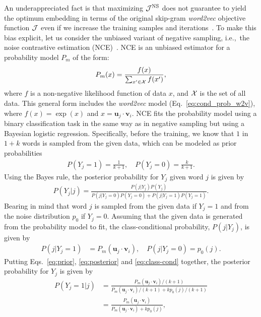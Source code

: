 \documentclass[12pt,draft,a4paper]{article}
\newcommand{\vect}[1]{\boldsymbol{#1}}
\def\ie{i.e.,~}
\begin{document}
An underappreciated fact is that maximizing ${\cal J}^{\text{NS}}$ does not guarantee
to yield the optimum embedding in terms of the original skip-gram {\it word2vec} objective function ${\cal J}$ even if we increase the training samples and iterations~\autocite{Chia2010,Dyer2014}.
To make this bias explicit, let us consider the unbiased variant of negative sampling, \ie the noise contrastive estimation (NCE)~\autocite{Chia2010,Dyer2014}.
NCE is an unbiased estimator for a probability model $P_m$ of the form:
\begin{align}
	\label{eq:nce-model}
	P_m(x) = \frac{ f(x) }{\sum_{ x' \in {\cal X}} f(x') },
\end{align}
where $f$ is a non-negative likelihood function of data $x$, and ${\cal X}$ is the set of all data.
This general form includes the {\it word2vec} model (Eq.~\eqref{eq:cond_prob_w2v}), where $f(x) = \exp(x)$ and $x = \vect{u}_j \cdot \vect{v}_{i}$.
NCE fits the probability model using a binary classification task in the same way as in negative sampling but using a Bayesian logistic regression.
Specifically, before the training, we know that $1$ in $1+k$ words is sampled from the given data, which can be modeled as prior probabilities
\begin{align}
	\label{eq:prior}
	P(Y_{j} = 1) = \frac{1}{k + 1},\quad P(Y_{j} = 0) = \frac{k}{k + 1}.
\end{align}
Using the Bayes rule, the posterior probability for $Y_{j}$ given word $j$ is given by
\begin{align}
	\label{eq:posterior}
	P\left(Y_{j} \vert j\right) = \frac{
		P\left(j \vert Y_{j}\right)P(Y_{j})
	}{
		P\left(j \vert Y_{j} = 0\right)P(Y_{j} = 0)
		+ P\left(j \vert Y_{j} = 1\right)P(Y_{j} = 1)
	}.
\end{align}
Bearing in mind that word $j$ is sampled from the given data if $Y_{j}=1$ and from the noise distribution $p_0$ if $Y_j = 0$.
Assuming that the given data is generated from the probability model to fit, the class-conditional probability, $P\left(j \vert Y_{j}\right)$, is given by
\begin{align}
	\label{eq:class-cond}
	P(j \vert Y_{j} = 1) & = P_m(\vect{u}_j \cdot \vect{v}_{i}),
	\quad
	P(j \vert Y_{j} = 0)  = p_0 (j).
\end{align}
Putting Eqs.~\eqref{eq:prior}, \eqref{eq:posterior} and \eqref{eq:class-cond} together, the posterior probability for $Y_j$ is given by
\begin{align}
	\label{eq:nce}
	P\left(Y_{j} = 1 \vert j\right) & =
	\frac{
		P_m(\vect{u}_j \cdot \vect{v}_{i}) / (k + 1)
	}{
		P_m(\vect{u}_j \cdot \vect{v}_{i}) / (k + 1)  + kp_0(j) / (k + 1)
	}                                          \\
	                                & = \frac{
		P_m(\vect{u}_j \cdot \vect{v}_{i})
	}{
		P_m(\vect{u}_j \cdot \vect{v}_{i})  + kp_0(j)
	},
\end{align}
\end{document}
